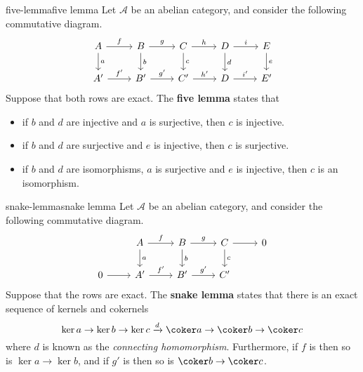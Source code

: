 \begin{topic}{five-lemma}{five lemma}
    Let $\mathcal{A}$ be an abelian category, and consider the following commutative diagram.
    \[ \begin{tikzcd} A \arrow{r}{f} \arrow{d}{a} & B \arrow{r}{g} \arrow{d}{b} & C \arrow{r}{h} \arrow{d}{c} & D \arrow{r}{i} \arrow{d}{d} & E \arrow{d}{e} \\ A' \arrow{r}{f'} & B' \arrow{r}{g'} & C' \arrow{r}{h'} & D \arrow{r}{i'} & E' \end{tikzcd} \]
    Suppose that both rows are exact. The \textbf{five lemma} states that
    \begin{itemize}
        \item if $b$ and $d$ are injective and $a$ is surjective, then $c$ is injective.
        
        \item if $b$ and $d$ are surjective and $e$ is injective, then $c$ is surjective.
        
        \item if $b$ and $d$ are isomorphisms, $a$ is surjective and $e$ is injective, then $c$ is an isomorphism.
    \end{itemize}
\end{topic}

\begin{topic}{snake-lemma}{snake lemma}
    Let $\mathcal{A}$ be an abelian category, and consider the following commutative diagram.
    \[ \begin{tikzcd} & A \arrow{d}{a} \arrow{r}{f} & B \arrow{d}{b} \arrow{r}{g} & C \arrow{d}{c} \arrow{r} & 0 \\ 0 \arrow{r} & A' \arrow{r}{f'} & B' \arrow{r}{g'} & C' \end{tikzcd} \]
    Suppose that the rows are exact. The \textbf{snake lemma} states that there is an exact sequence of kernels and cokernels
    \[ \ker a \rightarrow \ker b \rightarrow \ker c \xrightarrow{d} \coker a \rightarrow \coker b \rightarrow \coker c \]
    where $d$ is known as the \textit{connecting homomorphism}. Furthermore, if $f$ is  then so is $\ker a \to \ker b$, and if $g'$ is  then so is $\coker b \to \coker c$.
\end{topic}

